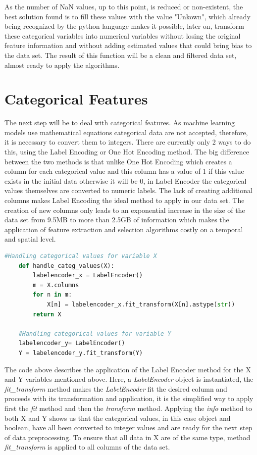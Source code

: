 As the number of NaN values, up to this point, is reduced or non-existent, the best solution found is to fill these values with the value "Unkown", which already being recognized by the python language makes it possible, later on, transform these categorical variables into numerical variables without losing the original feature information and without adding estimated values that could bring bias to the data set.
The result of this function will be a clean and filtered data set, almost ready to apply the algorithms.

\section{Categorical Features} %
\label{sec:categorical_values}
\hspace{10px}The next step will be to deal with categorical features. As machine learning models use mathematical equations categorical data are not accepted, therefore, it is necessary to convert them to integers. There are currently only 2 ways to do this, using the Label Encoding or One Hot Encoding method. The big difference between the two methods is that unlike One Hot Encoding which creates a column for each categorical value and this column has a value of 1 if this value exists in the initial data otherwise it will be 0, in Label Encoder the categorical values themselves are converted to numeric labels.
The lack of creating additional columns makes Label Encoding the ideal method to apply in our data set. The creation of new columns only leads to an exponential increase in the size of the data set from 9.5MB to more than 2.5GB of information which makes the application of feature extraction and selection algorithms costly on a temporal and spatial level.

\begin{lstlisting}[language=Python]
    #Handling categorical values for variable X
    def handle_categ_values(X):
        labelencoder_x = LabelEncoder()
        m = X.columns
        for n in m:
            X[n] = labelencoder_x.fit_transform(X[n].astype(str))  
        return X
        
    #Handling categorical values for variable Y
    labelencoder_y= LabelEncoder()  
    Y = labelencoder_y.fit_transform(Y)
\end{lstlisting}

The code above describes the application of the Label Encoder method for the X and Y variables mentioned above. Here, a \textit{LabelEncoder} object is instantiated, the \textit{fit\_transform} method makes the \textit{LabelEncoder} fit the desired column and proceeds with its transformation and application, it is the simplified way to apply first the \textit{fit} method and then the \textit{transform} method. Applying the \textit{info} method to both X and Y shows us that the categorical values, in this case object and boolean, have all been converted to integer values and are ready for the next step of data preprocessing. To ensure that all data in X are of the same type, method \textit{fit\_transform} is applied to all columns of the data set.

